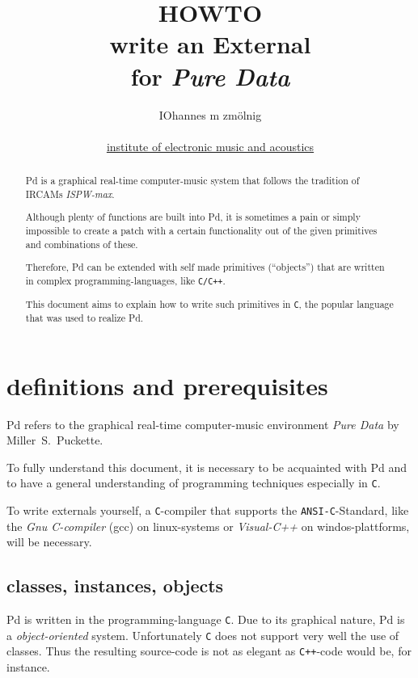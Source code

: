 \documentclass[12pt, a4paper,english,titlepage]{article}
\title{
HOWTO \\
write an External \\
for {\em Pure Data}
}
\author{
IOhannes m zmölnig \\
\\
\href{http://iem.at/}{institute of electronic music and acoustics}
}
\date{}
\begin{document}
\maketitle

\begin{abstract}
Pd is a graphical real-time computer-music  system that follows the tradition of
IRCAMs {\em ISPW-max}.

Although plenty of functions are built into Pd,
it is sometimes a pain or simply impossible to create a patch with a certain
functionality out of the given primitives and combinations of these.

Therefore, Pd can be extended with self made primitives (``objects'')
that are written in complex programming-languages, like {\tt C/C++}. 

This document aims to explain how to write such primitives in {\tt C},
the popular language that was used to realize Pd.


\end{abstract}


\vfill
\newpage

\tableofcontents

\vfill
\newpage

\section{definitions and prerequisites}
Pd refers to the graphical real-time computer-music environment {\em Pure Data}
by Miller~S.~Puckette.

To fully understand this document, it is necessary to
be acquainted with Pd and to 
have a general understanding of programming techniques especially in {\tt C}.

To write externals yourself, a {\tt C}-compiler that supports the
{\tt ANSI-C}-Standard, like the {\em Gnu C-compiler} (gcc) on linux-systems or
{\em Visual-C++} on windos-plattforms, will be necessary.

\subsection{classes, instances, objects}
Pd is written in the programming-language {\tt C}.
Due to its graphical nature, Pd is a {\em object-oriented} system.
Unfortunately {\tt C} does not support very well the use of classes.
Thus the resulting source-code is not as elegant as {\tt C++}-code would be, for instance.
\end{document}

